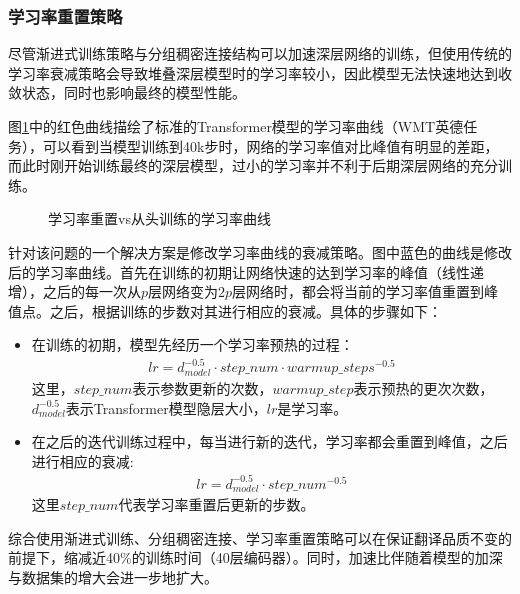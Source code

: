 \subsubsection{学习率重置策略}

\parinterval 尽管渐进式训练策略与分组稠密连接结构可以加速深层网络的训练，但使用传统的学习率衰减策略会导致堆叠深层模型时的学习率较小，因此模型无法快速地达到收敛状态，同时也影响最终的模型性能。

\parinterval  图\ref{fig:7-32}中的红色曲线描绘了标准的Transformer模型的学习率曲线（WMT英德任务），可以看到当模型训练到40k步时，网络的学习率值对比峰值有明显的差距，而此时刚开始训练最终的深层模型，过小的学习率并不利于后期深层网络的充分训练。

\begin{figure}[htp]
\centering

\caption{学习率重置vs从头训练的学习率曲线}
\label{fig:7-32}
\end{figure}

\parinterval 针对该问题的一个解决方案是修改学习率曲线的衰减策略。图中蓝色的曲线是修改后的学习率曲线。首先在训练的初期让网络快速的达到学习率的峰值（线性递增），之后的每一次从$p$层网络变为$2p$层网络时，都会将当前的学习率值重置到峰值点。之后，根据训练的步数对其进行相应的衰减。具体的步骤如下：
\begin{itemize}
\vspace{0.5em}
\item 在训练的初期，模型先经历一个学习率预热的过程：
\begin{eqnarray}
lr=d_{model}^{-0.5}\cdot step\_num \cdot warmup\_steps^{-0.5}
\label{eq:7-22}
\end{eqnarray}
这里，$step\_num$表示参数更新的次数，$warmup\_step$表示预热的更次次数，$d_{model}^{-0.5}$表示Transformer模型隐层大小，$lr$是学习率。
\vspace{0.5em}
\item 	在之后的迭代训练过程中，每当进行新的迭代，学习率都会重置到峰值，之后进行相应的衰减:
\begin{eqnarray}
lr=d_{model}^{-0.5}\cdot step\_num^{-0.5}
\label{eq:7-23}
\end{eqnarray}
这里$step\_num$代表学习率重置后更新的步数。
\end{itemize}

\parinterval 综合使用渐进式训练、分组稠密连接、学习率重置策略可以在保证翻译品质不变的前提下，缩减近40\%的训练时间（40层编码器）。同时，加速比伴随着模型的加深与数据集的增大会进一步地扩大。


